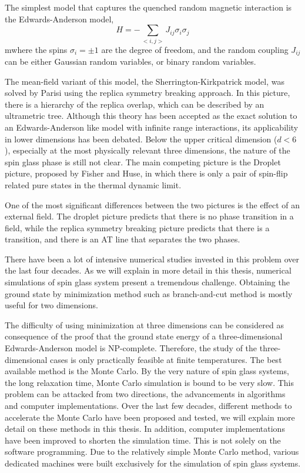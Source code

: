 The simplest model that captures the quenched random magnetic interaction
is the Edwards-Anderson model\cite{Edwards-Anderson1975},
\begin{equation}
  \label{eq:11}
  H=-\sum_{<i,j>}J_{ij}\sigma_i\sigma_j
\end{equation}
mwhere the spins $\sigma_i=\pm 1$ are the degree of freedom, and the random coupling
$J_{ij}$ can be either Gaussian random variables, or binary random variables.

The mean-field variant of this model, the Sherrington-Kirkpatrick model\cite{Sherrington-Kirkpatrick1978,Sherrington-Kirkpatrick-1975}, was 
solved by Parisi\cite{Parisi-1980a,Parisi-1980b,Parisi1980} using the replica 
symmetry breaking approach. In this picture,
there is a hierarchy of the replica overlap, which can be described by an ultrametric
tree. Although this theory has been accepted as the exact solution to an Edwards-Anderson
like model with infinite range interactions, its applicability in lower dimensions 
has been debated. Below the upper critical dimension ($d<6$)\cite{Harris-Lubensky-Chen-1976,Tasaki-1989,Green-Moore-Bray-1983}, 
especially at the most
physically relevant three dimensions, the nature of the spin glass phase is still not clear. 
The main competing picture is the Droplet picture, proposed by Fisher and Huse\citep{Fisher-Huse-1987,Fisher-Huse-1988}, in which 
there is only a pair of spin-flip related pure states in the thermal dynamic
limit.

One of the most significant differences between the two pictures is the effect 
of an external field\cite{Young-Katzgraber2004}. The droplet picture predicts that there is no phase transition
in a field, while the replica symmetry breaking picture predicts that there is a 
transition, and there is an AT line that separates the two phases. 

There have been a lot of intensive numerical studies invested in this problem over 
the last four decades. As we will explain in more detail in this thesis, numerical
simulations of spin glass system present a tremendous challenge. Obtaining the ground
state by minimization method such as branch-and-cut method is mostly useful for 
two dimensions. 

The difficulty of using minimization at three dimensions can be 
considered as consequence of the proof that the ground state energy of a three-dimensional
Edwards-Anderson model is NP-complete\cite{Barahona-1982}. Therefore, the study of the three-dimensional
cases is only practically feasible at finite temperatures. The best available method
is the Monte Carlo. By the very nature of spin glass systems, the long relaxation time, 
Monte Carlo simulation is bound to be very slow. This problem can be attacked from 
two directions, the advancements in algorithms and computer implementations. 
Over the last few decades, different methods to accelerate the Monte Carlo 
have been proposed and tested, we will explain more detail on these methods in this thesis. 
In addition, computer implementations have been improved to shorten the simulation
time. This is not solely on the software programming. Due to the relatively 
simple Monte Carlo method, various dedicated machines were built exclusively for the simulation
of spin glass systems. 

